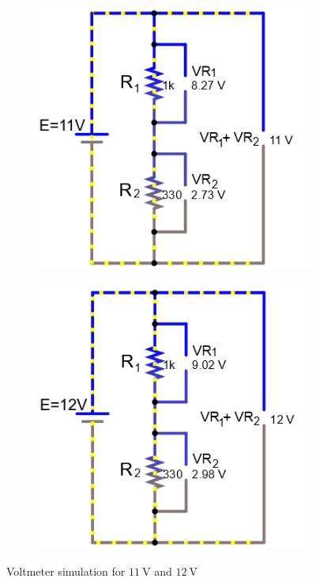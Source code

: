 \documentclass[a4paper]{article}
\begin{document}
\begin{figure}[H]
\begin{subfigure}{0.48\textwidth}
\includegraphics[width=1.05\linewidth]{volts_11}
\end{subfigure}
\begin{subfigure}{0.48\textwidth}
\includegraphics[width=1.05\linewidth]{volts_12}
\end{subfigure}
\caption{Voltmeter simulation for $\SI{11}{\volt}$ and $\SI{12}{\volt}$}
\label{fig:3}
\end{figure}
\end{document}
